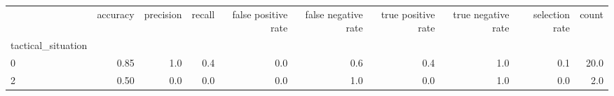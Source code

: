 \begin{tabular}{lrrrrrrrrr}
\toprule
{} &  accuracy &  precision &  recall &  false positive rate &  false negative rate &  true positive rate &  true negative rate &  selection rate &  count \\
tactical\_situation &           &            &         &                      &                      &                     &                     &                 &        \\
\midrule
0                  &      0.85 &        1.0 &     0.4 &                  0.0 &                  0.6 &                 0.4 &                 1.0 &             0.1 &   20.0 \\
2                  &      0.50 &        0.0 &     0.0 &                  0.0 &                  1.0 &                 0.0 &                 1.0 &             0.0 &    2.0 \\
\bottomrule
\end{tabular}

